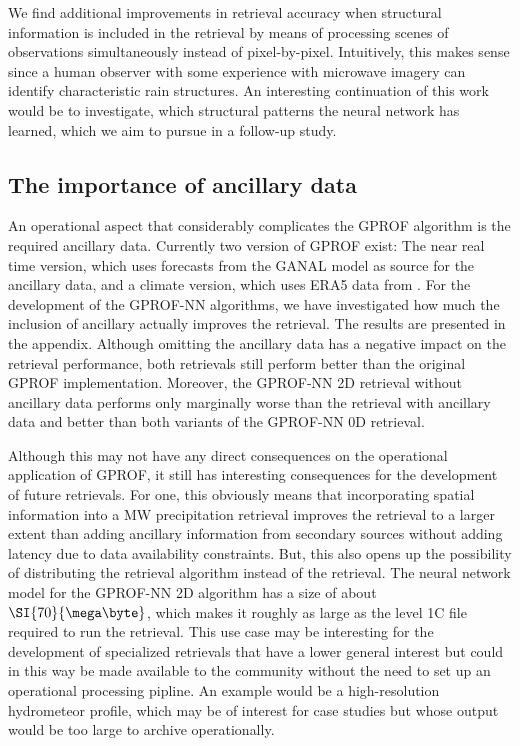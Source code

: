 \documentclass[a4paper,11pt,bibtotoc]{scrartcl}
\begin{document}
We find additional improvements in retrieval accuracy when structural
information is included in the retrieval by means of processing scenes of
observations simultaneously instead of pixel-by-pixel. Intuitively, this makes
sense since a human observer with some experience with microwave imagery can
identify characteristic rain structures. An interesting continuation of
this work would be to investigate, which structural patterns the neural
network has learned, which we aim to pursue in a follow-up study.

\subsection{The importance of ancillary data}

An operational aspect that considerably complicates the GPROF algorithm is
the required ancillary data. Currently two version of GPROF exist: The
near real time version, which uses forecasts from the GANAL model as source
for the ancillary data, and a climate version, which uses ERA5 data from
\citep{era5}. For the development of the GPROF-NN algorithms, we have
investigated how much the inclusion of ancillary actually improves the
retrieval. The results are presented in the appendix. Although omitting
the ancillary data has a negative impact on the retrieval performance,
both retrievals still perform better than the original GPROF
implementation. Moreover, the GPROF-NN 2D retrieval without ancillary
data performs only marginally worse than the retrieval with ancillary
data and better than both variants of the GPROF-NN 0D retrieval.

Although this may not have any direct consequences on the operational
application of GPROF, it still has interesting consequences for the development
of future retrievals. For one, this obviously means that incorporating spatial
information into a MW precipitation retrieval improves the retrieval to a larger
extent than adding ancillary information from secondary sources without adding
latency due to data availability constraints. But, this also opens up the
possibility of distributing the retrieval algorithm instead of the retrieval.
The neural network model for the GPROF-NN 2D algorithm has a size of about
$\SI{70}{\mega \byte}$, which makes it roughly as large as the level 1C file
required to run the retrieval. This use case may be interesting for the
development of specialized retrievals that have a lower general interest but
could in this way be made available to the community without the need to set up
an operational processing pipline. An example would be a high-resolution
hydrometeor profile, which may be of interest for case studies but whose output
would be too large to archive operationally.
\end{document}
